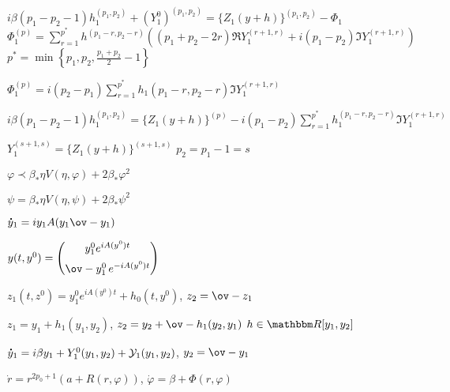 \documentclass[timbord]{longnotes}
\begin{document}
\begin{list}
  \item $i \beta (p_1 - p_2 -1)h_1^{(p_1,p_2)} + {\left(Y_1^0\right)}^{(p_1,p_2)} =
    \{Z_1(y+h)\}^{(p_1,p_2)} - \Phi_1$ \\
    $\Phi_1^{(p)} 
    = \sum_{r=1}^{p^*} h^{(p_1-r,p_2-r)}\left(( p_1+p_2 -2r) \Re Y_1^{(r+1,r)} + i (p_1-p_2) \Im
    Y_1^{(r+1,r)}\right)$ \\
    $p^* = \min\left\{p_1,p_2, \frac{p_1+p_2}2-1\right\}$
  \item $\Phi_1^{(p)} = i(p_2-p_1)\sum_{r=1}^{p^*} h_1(p_1-r,p_2-r) \Im Y_1^{(r+1,r)}$
  \item $i \beta (p_1 - p_2 -1) h_1^{(p_1,p_2)} 
    = \{Z_1(y+h)\}^{(p)} - i (p_1-p_2) \sum_{r=1}^{p^*}h_1^{(p_1-r,p_2-r)} \Im Y_1^{(r+1,r)}$
  \item $Y_1^{(s+1,s)} = \{Z_1(y+h)\}^{(s+1,s)}$ \hfill $p_2 = p_1 -1=s$
  \item $\varphi \prec \beta_*  \eta V(\eta,\varphi) + 2 \beta_* \varphi^2 $
  \item $\psi =  \beta_*  \eta V(\eta,\psi) + 2 \beta_* \psi^2 $
  \item $\dot y_1 = i y_1 A(y_1 \ov-{y_1})$
\item $y(t,y^0)= \begin{pmatrix} y_1^0 e^{iA(y^0)t} \\[0.5em] \ov-{y_1^0}\, e^{-iA(y^0)t}\end{pmatrix}$
  \item $z_1(t,z^0) = y_1^0 e^{iA(y^0)t} + h_0(t,y^0)$, $z_2 = \ov-{z_1}$
  \item $z_1 = y_1 + h_1(y_1,y_2)$, $z_2 = y_2 + \ov-{h_1}(y_2,y_1)$ \hfill $h \in \R[y_1,y_2]$
  \item $\dot y_1 = i \beta y_1 + Y_1^0(y_1,y_2) + {\cal Y}_1(y_1,y_2)$, $y_2 = \ov-{y_1}$
  \item $\dot r = r^{2p_0+1} (a+R(r, \varphi))$, $\dot \varphi = \beta + \Phi(r,\varphi)$
\end{list}
\end{document}
